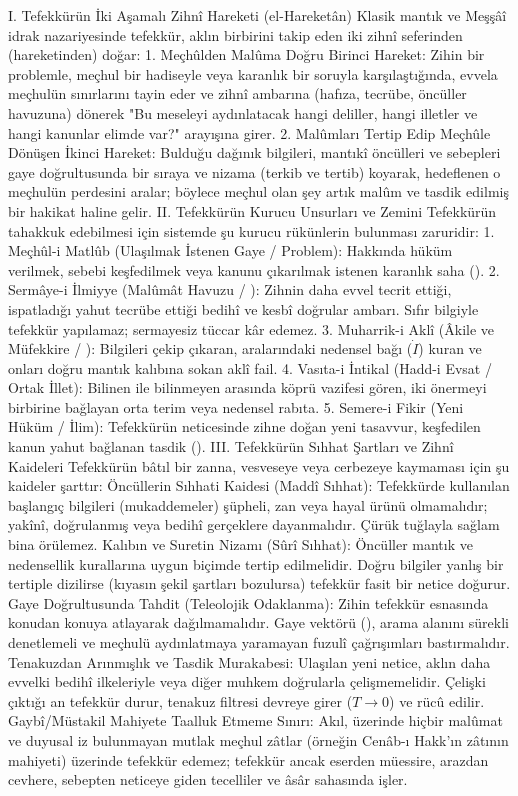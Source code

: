 \documentclass[11pt,a4paper]{article}
\begin{document}
I. Tefekkürün İki Aşamalı Zihnî Hareketi (el-Hareketân)
Klasik mantık ve Meşşâî idrak nazariyesinde tefekkür, aklın birbirini takip eden iki zihnî seferinden (hareketinden) doğar:
1. Meçhûlden Malûma Doğru Birinci Hareket:
Zihin bir problemle, meçhul bir hadiseyle veya karanlık bir soruyla karşılaştığında, evvela meçhulün sınırlarını tayin eder ve zihnî ambarına (hafıza, tecrübe, öncüller havuzuna) dönerek "Bu meseleyi aydınlatacak hangi deliller, hangi illetler ve hangi kanunlar elimde var?" arayışına girer.
2. Malûmları Tertip Edip Meçhûle Dönüşen İkinci Hareket:
Bulduğu dağınık bilgileri, mantıkî öncülleri ve sebepleri gaye doğrultusunda bir sıraya ve nizama (terkib ve tertib) koyarak, hedeflenen o meçhulün perdesini aralar; böylece meçhul olan şey artık malûm ve tasdik edilmiş bir hakikat haline gelir.
II. Tefekkürün Kurucu Unsurları ve Zemini
Tefekkürün tahakkuk edebilmesi için sistemde şu kurucu rükünlerin bulunması zaruridir:
 1. Meçhûl-i Matlûb (Ulaşılmak İstenen Gaye / Problem): Hakkında hüküm verilmek, sebebi keşfedilmek veya kanunu çıkarılmak istenen karanlık saha ().
 2. Sermâye-i İlmiyye (Malûmât Havuzu / ): Zihnin daha evvel tecrit ettiği, ispatladığı yahut tecrübe ettiği bedihî ve kesbî doğrular ambarı. Sıfır bilgiyle tefekkür yapılamaz; sermayesiz tüccar kâr edemez.
 3. Muharrik-i Aklî (Âkile ve Müfekkire / ): Bilgileri çekip çıkaran, aralarındaki nedensel bağı (⁠$\dot{I}$⁠) kuran ve onları doğru mantık kalıbına sokan aklî fail.
 4. Vasıta-i İntikal (Hadd-i Evsat / Ortak İllet): Bilinen ile bilinmeyen arasında köprü vazifesi gören, iki önermeyi birbirine bağlayan orta terim veya nedensel rabıta.
 5. Semere-i Fikir (Yeni Hüküm / İlim): Tefekkürün neticesinde zihne doğan yeni tasavvur, keşfedilen kanun yahut bağlanan tasdik ().
III. Tefekkürün Sıhhat Şartları ve Zihnî Kaideleri
Tefekkürün bâtıl bir zanna, vesveseye veya cerbezeye kaymaması için şu kaideler şarttır:
 Öncüllerin Sıhhati Kaidesi (Maddî Sıhhat):
Tefekkürde kullanılan başlangıç bilgileri (mukaddemeler) şüpheli, zan veya hayal ürünü olmamalıdır; yakînî, doğrulanmış veya bedihî gerçeklere dayanmalıdır. Çürük tuğlayla sağlam bina örülemez.
 Kalıbın ve Suretin Nizamı (Sûrî Sıhhat):
Öncüller mantık ve nedensellik kurallarına uygun biçimde tertip edilmelidir. Doğru bilgiler yanlış bir tertiple dizilirse (kıyasın şekil şartları bozulursa) tefekkür fasit bir netice doğurur.
 Gaye Doğrultusunda Tahdit (Teleolojik Odaklanma):
Zihin tefekkür esnasında konudan konuya atlayarak dağılmamalıdır. Gaye vektörü (), arama alanını sürekli denetlemeli ve meçhulü aydınlatmaya yaramayan fuzulî çağrışımları bastırmalıdır.
 Tenakuzdan Arınmışlık ve Tasdik Murakabesi:
Ulaşılan yeni netice, aklın daha evvelki bedihî ilkeleriyle veya diğer muhkem doğrularla çelişmemelidir. Çelişki çıktığı an tefekkür durur, tenakuz filtresi devreye girer (⁠$T \to 0$⁠) ve rücû edilir.
 Gaybî/Müstakil Mahiyete Taalluk Etmeme Sınırı:
Akıl, üzerinde hiçbir malûmat ve duyusal iz bulunmayan mutlak meçhul zâtlar (örneğin Cenâb-ı Hakk'ın zâtının mahiyeti) üzerinde tefekkür edemez; tefekkür ancak eserden müessire, arazdan cevhere, sebepten neticeye giden tecelliler ve âsâr sahasında işler.
\end{document}
